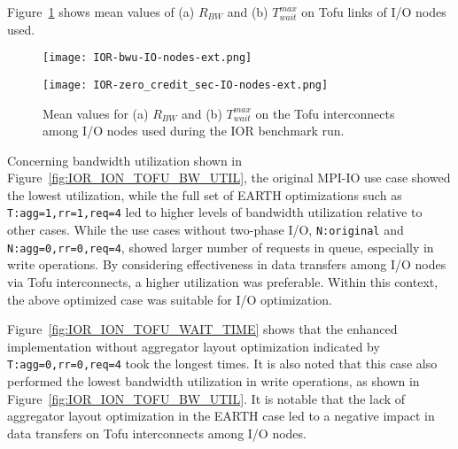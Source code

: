 \documentclass{jhps}
\begin{document}
Figure~\ref{fig:IOR_ION_TOFU_BWU_WAIT_TIME} shows mean values of
(a) $R_{BW}$ and (b) $T_{wait}^{max}$ on Tofu links of I/O nodes used.
%
\begin{figure}[tb]
\centering
\begin{minipage}[t]{0.48\textwidth}
 \centering
 \texttt{[image: IOR-bwu-IO-nodes-ext.png]}
 \label{fig:IOR_ION_TOFU_BW_UTIL}
\end{minipage}
%
\noindent
\begin{minipage}[t]{0.48\textwidth}
 \centering
 \texttt{[image: IOR-zero\_credit\_sec-IO-nodes-ext.png]}
 \label{fig:IOR_ION_TOFU_WAIT_TIME}
\end{minipage}
\caption{
Mean values for (a) $R_{BW}$ and (b) $T_{wait}^{max}$ on the Tofu interconnects
among I/O nodes used during the IOR benchmark run.}
\label{fig:IOR_ION_TOFU_BWU_WAIT_TIME}
\end{figure}
%
Concerning bandwidth utilization shown in
Figure~\ref{fig:IOR_ION_TOFU_BW_UTIL},
the original MPI-IO use case showed the lowest utilization,
while the full set of EARTH optimizations such as {\tt T:agg=1,rr=1,req=4}
led to higher levels of bandwidth utilization relative to other cases.
While the use cases without two-phase I/O,
{\tt N:original} and {\tt N:agg=0,rr=0,req=4}, showed
larger number of requests in queue, especially in write operations.
By considering effectiveness in data transfers among I/O nodes via Tofu interconnects,
a higher utilization was preferable.
Within this context, the above optimized case was suitable for I/O optimization.

Figure~\ref{fig:IOR_ION_TOFU_WAIT_TIME}
shows that the enhanced implementation
without aggregator layout optimization indicated by {\tt T:agg=0,rr=0,req=4}
took the longest times.
It is also noted that this case also performed the lowest bandwidth utilization
in write operations,
as shown in Figure~\ref{fig:IOR_ION_TOFU_BW_UTIL}.
It is notable that the lack of aggregator layout optimization in the EARTH case
led to a negative impact in data transfers on Tofu interconnects among I/O nodes.
\end{document}
